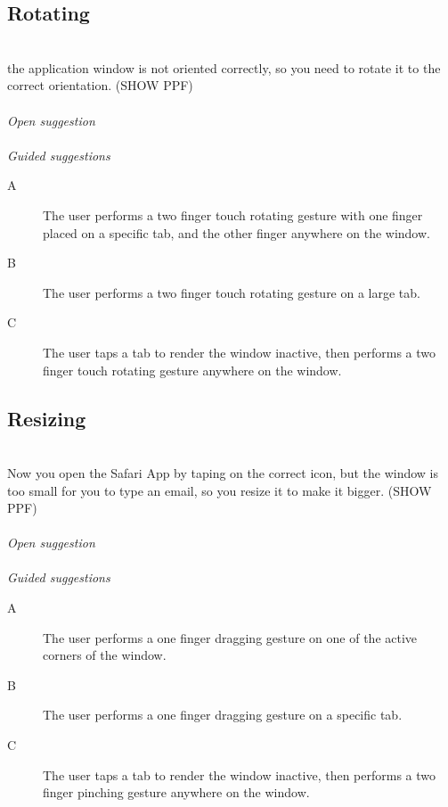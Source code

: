 \documentclass[11pt]{amsart}
\begin{document}
\subsection{Rotating}
\hfill\\
the application window is not oriented correctly, so you need to rotate it to the correct orientation. 
(SHOW PPF)
\\\\
\emph{Open suggestion}
\\\\
\emph{Guided suggestions}
\begin{description}
\item[A]{The user performs a two finger touch rotating gesture with one finger placed on a specific tab, and the other finger anywhere on the window.}
\item[B]{The user performs a two finger touch rotating gesture on a large tab.}
\item[C]{The user taps a tab to render the window inactive, then performs a two finger touch rotating gesture anywhere on the window.}
\end{description}

\subsection{Resizing}
\hfill\\
Now you open the Safari App by taping on the correct icon, but the window is too small for you to type an email, so you resize it to make it bigger.
(SHOW PPF)
\\\\
\emph{Open suggestion}
\\\\
\emph{Guided suggestions}
\begin{description}
\item[A]{The user performs a one finger dragging gesture on one of the active corners of the window.}
\item[B]{The user performs a one finger dragging gesture on a specific tab.}
\item[C]{The user taps a tab to render the window inactive, then performs a two finger pinching gesture anywhere on the window.}
\end{description}
\end{document}
